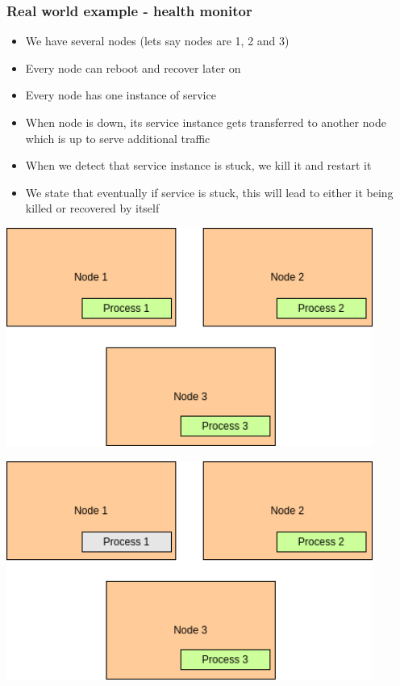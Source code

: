 \documentclass{beamer}
\begin{document}
\begin{frame}[fragile]
    \frametitle{Real world example - health monitor}
    \begin{itemize}
        \item We have several nodes (lets say nodes are 1, 2 and 3)
        \item Every node can reboot and recover later on 
        \item Every node has one instance of service 
        \item When node is down, its service instance gets transferred to another node which is up to serve additional traffic
        \item When we detect that service instance is stuck, we kill it and restart it 
        \item We state that eventually if service is stuck, this will lead to either it being killed or recovered by itself
    \end{itemize}
\end{frame}

\begin{frame}
    \includegraphics[width=0.9\textwidth, height=0.9\textheight]{img/scenario_1.drawio.png}
\end{frame}



\begin{frame}
    \includegraphics[width=0.9\textwidth, height=0.9\textheight]{img/scenario_2.drawio.png}
\end{frame}
\end{document}
